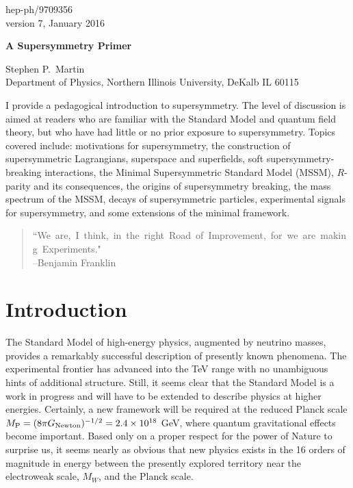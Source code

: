 \documentclass[11pt]{article}
\def\MPlanck{M_{\rm P}}
\begin{document}
\setcounter{footnote}{1}
\begin{flushright}
hep-ph/9709356\\
version 7, January 2016
\end{flushright}

\begin{center}
{\Large\bf A Supersymmetry Primer}\\

\vspace{0.14in}

{\sc Stephen P.~Martin} \\
Department of Physics, Northern Illinois University, DeKalb IL 60115 
\end{center}

\begin{center}
\begin{minipage}[]{0.86\linewidth}
I provide a pedagogical introduction to supersymmetry. The level of 
discussion is aimed at readers who are familiar with the Standard Model 
and quantum field theory, but who have had little or no prior exposure to 
supersymmetry. Topics covered include: motivations for supersymmetry, the 
construction of supersymmetric Lagrangians, superspace and superfields, 
soft supersymmetry-breaking interactions, the Minimal Supersymmetric 
Standard Model (MSSM), $R$-parity and its consequences, the origins of 
supersymmetry breaking, the mass spectrum of the MSSM, decays of 
supersymmetric particles, experimental signals for supersymmetry, and 
some extensions of the minimal framework.
\end{minipage}
\end{center}

\tableofcontents
\newpage
\setlength{\baselineskip}{1.05\baselineskip}
\begin{quotation}
\noindent
\mbox{``We are, I think, in the right Road of Improvement, for we are making Experiments."}\\
--Benjamin Franklin
\end{quotation}

\section{Introduction}\label{sec:intro}
\setcounter{equation}{0}
\setcounter{figure}{0}
\setcounter{table}{0}
\setcounter{footnote}{1}

The Standard Model of high-energy physics, augmented by neutrino masses,
provides a remarkably successful description of presently known phenomena.
The experimental frontier has advanced into the TeV range with no
unambiguous hints of additional structure. Still, it seems clear that the
Standard Model is a work in progress and will have to be extended to
describe physics at higher energies. Certainly, a new framework will be
required at the reduced Planck scale
$\MPlanck = (8 \pi G_{\rm Newton})^{-1/2} = 2.4 \times 10^{18}$ GeV, 
where quantum gravitational effects become important. Based only on a
proper respect for the power of Nature to surprise us, it seems nearly as
obvious that new physics exists in the 16 orders of magnitude in energy
between the presently explored territory near the electroweak scale,
$M_W$, and the Planck scale. 
\end{document}

